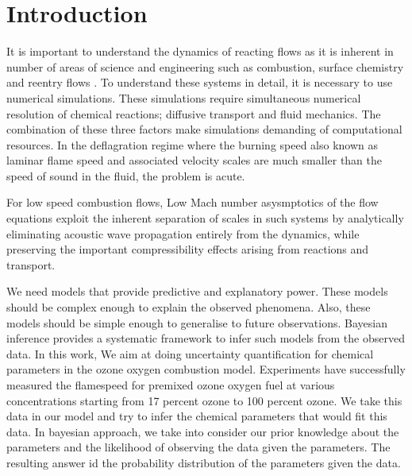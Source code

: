 \chapter{Introduction}

It is important to understand the dynamics of reacting flows as it is inherent in number of areas of science and engineering such as combustion, surface chemistry and reentry flows . To understand these systems in detail, it is necessary to use numerical simulations. These simulations require simultaneous numerical resolution of chemical reactions; diffusive transport and fluid mechanics. The combination of these three factors make simulations demanding of computational resources. In the deflagration regime where the burning speed also known as laminar flame speed and associated velocity scales are much smaller than the speed of sound in the fluid, the problem is acute.

\bigskip
\noindent For low speed combustion flows, Low Mach number asysmptotics of the flow equations exploit the inherent separation of scales in such systems by analytically eliminating acoustic wave propagation entirely from the dynamics, while preserving the important compressibility effects arising from reactions and transport.

\bigskip
\noindent  We need models that provide predictive and explanatory power. These models should be complex enough to explain the observed phenomena. Also, these models should be simple enough to generalise to future observations. Bayesian inference provides a systematic framework to infer such models from the observed data. 
In this work, We aim at doing uncertainty quantification for chemical parameters in the ozone oxygen combustion model. Experiments\cite{Streng} have successfully measured the flamespeed for premixed ozone oxygen   fuel at various concentrations starting from  17 percent ozone to 100 percent ozone. We take this data in our model and try to infer the chemical parameters that would fit this data. In bayesian approach, we take into consider our prior knowledge about the parameters and the likelihood of observing the data given the parameters. The resulting answer id the probability distribution of the parameters given the data.  



